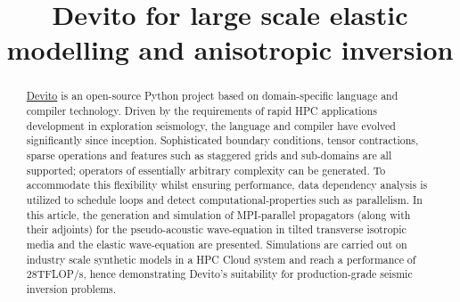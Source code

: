 \documentclass[conference]{IEEEtran}
\begin{document}
\title{Devito for large scale elastic modelling and anisotropic inversion}

\author{
\and
{}
\and
{}
\and
{}
\and
{}
\and
{}
\and
{}
\and
{}
}

\maketitle

\begin{abstract}\label{abstract}

\href{https://github.com/devitocodes/devito}{Devito} is an open-source
Python project based on domain-specific language and compiler
technology. Driven by the requirements of rapid HPC applications
development in exploration seismology, the language and compiler have
evolved significantly since inception. Sophisticated boundary
conditions, tensor contractions, sparse operations and features such as
staggered grids and sub-domains are all supported; operators of
essentially arbitrary complexity can be generated. To accommodate this
flexibility whilst ensuring performance, data dependency analysis is
utilized to schedule loops and detect computational-properties such as
parallelism. In this article, the generation and simulation of
MPI-parallel propagators (along with their adjoints) for the
pseudo-acoustic wave-equation in tilted transverse isotropic media and
the elastic wave-equation are presented. Simulations are carried out on
industry scale synthetic models in a HPC Cloud system and reach a
performance of 28TFLOP/s, hence demonstrating Devito's suitability for
production-grade seismic inversion problems.
\end{abstract}
\end{document}
